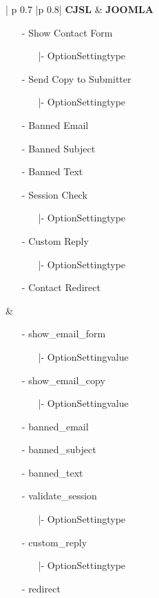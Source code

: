 \begin{minipage}{0.7\textwidth}
\begin{longtable}{| p {0.7\textwidth} |p {0.8\textwidth}|}
\hline
\textbf{CJSL}
&  
\textbf{JOOMLA} \\ \hline
 \begin{enumerate}
	\item[-] Show Contact Form
		\begin{enumerate}
	   			\item[|-] OptionSettingtype
	   		\end{enumerate} 
	\item[-] Send Copy to Submitter
		\begin{enumerate}
	   			\item[|-] OptionSettingtype
	   		\end{enumerate}
	\item[-] Banned Email 
	\item[-] Banned Subject 
	\item[-] Banned Text
	\item[-] Session Check
		\begin{enumerate}
	   			\item[|-] OptionSettingtype
	   		\end{enumerate} 
	\item[-] Custom Reply
		\begin{enumerate}
	   			\item[|-] OptionSettingtype
	   		\end{enumerate} 
	\item[-] Contact Redirect
	\end{enumerate}
 &
 \begin{enumerate}
	\item[-] show\_email\_form
		\begin{enumerate}
	   			\item[|-] OptionSettingvalue
	   		\end{enumerate} 
	\item[-] show\_email\_copy
		\begin{enumerate}
	   			\item[|-] OptionSettingvalue
	   		\end{enumerate} 
	\item[-] banned\_email 
	\item[-] banned\_subject 
	\item[-] banned\_text 
	\item[-] validate\_session
		\begin{enumerate}
	   			\item[|-] OptionSettingtype
	   		\end{enumerate} 
	\item[-] custom\_reply
		\begin{enumerate}
	   			\item[|-] OptionSettingtype
	   		\end{enumerate} 
	\item[-] redirect
	\end{enumerate}
\\ \hline
\end{longtable}
\end{minipage}


